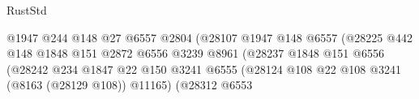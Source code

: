 \begin{lexlean}{RustStd}
\begin{coremodule}
                                                        @1947
                                                        @244
                                                        @148
                                                        @27
                                                        @6557
                                                        @2804
                                                        (@28107
                                                          @1947
                                                          @148
                                                          @6557
                                                          (@28225
                                                            @442
                                                            @148
                                                            @1848
                                                            @151
                                                            @2872
                                                            @6556
                                                            @3239
                                                            @8961
                                                            (@28237
                                                              @1848
                                                              @151
                                                              @6556
                                                              (@28242
                                                                @234
                                                                @1847
                                                                @22
                                                                @150
                                                                @3241
                                                                @6555
                                                                (@28124
                                                                  @108
                                                                  @22
                                                                  @108
                                                                  @3241
                                                                  (@8163 (@28129 @108))
                                                                  @11165)
                                                                (@28312
                                                                  @6553

\end{coremodule}
\end{lexlean}
